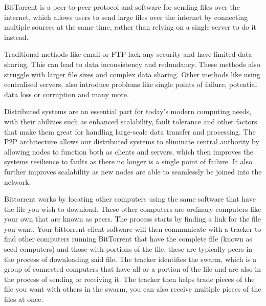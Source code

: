 \documentclass[landscape]{a0poster}
\begin{document}

\begin{multicols*}{3}

BitTorrent is a peer-to-peer protocol and software for sending files over the internet, which allows users to send large files over the internet by connecting multiple sources at the same time, rather than relying on a single server to do it instead.

Traditional methods like email or FTP lack any security and have limited data sharing. This can lead to data inconsistency and redundancy. These methods also struggle with larger file sizes and complex data sharing. Other methods like using centralised servers, also introduce problems like single points of failure, potential data loss or corruption and many more.

Distributed systems are an essential part for today’s modern computing needs, with their abilities such as enhanced scalability, fault tolerance and other factors that make them great for handling large-scale data transfer and processing. The P2P architecture allows our distributed systems to eliminate central authority by allowing nodes to function both as clients and servers, which then improves the systems resilience to faults as there no longer is a single point of failure. It also further improves scalability as new nodes are able to seamlessly be joined into the network.


Bittorrent works by locating other computers using the same software that have the file you wish to download. These other computers are ordinary computers like your own that are known as peers.
The process starts by finding a link for the file you want. Your bittorrent client software will then communicate with a tracker to find other computers running BitTorrent that have the complete file (known as seed computers) and those with portions of the file, these are typically peers in the process of downloading said file. The tracker identifies the swarm, which is a group of connected computers that have all or a portion of the file and are also in the process of sending or receiving it. The tracker then helps trade pieces of the file you want with others in the swarm, you can also receive multiple pieces of the files at once.


\end{multicols*}
\end{document}
